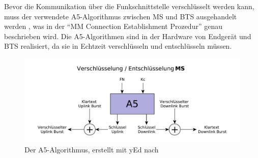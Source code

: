 Bevor die Kommunikation über die Funkschnittstelle verschlüsselt werden kann, muss der verwendete \ac{A5}-Algorithmus zwischen \ac{MS} und \ac{BTS} ausgehandelt werden , was in der "`\ac{MM} Connection Establishment Prozedur"'  genau beschrieben wird. Die \ac{A5}-Algorithmen sind in der Hardware von Endgerät und \ac{BTS} realisiert, da sie in Echtzeit verschlüsseln und entschlüsseln müssen.

\begin{figure}[H]
  \begin{center}
    \includegraphics[width=1.0\textwidth]{figures/gsm_a5.pdf}
  \end{center}
  \caption[Der A5-Algorithmus]{Der \ac{A5}-Algorithmus, erstellt mit yEd nach } \label{fig:a5-algorithm}
\end{figure}

